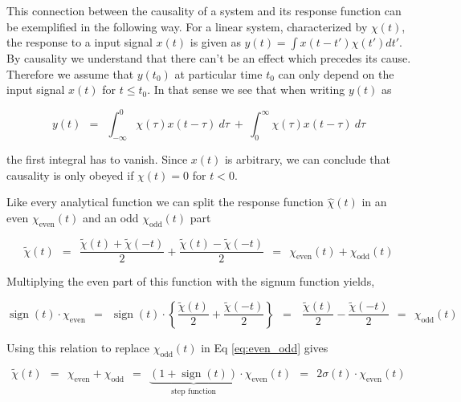 \documentclass[10pt]{report}
\numberwithin{equation}{chapter}
\newcommand{\refEq}[1]{
  Eq  \ref{#1}
}
\DeclareMathOperator{\sign}{sign}
\begin{document}
This connection between the causality of a system and its response function can be exemplified in the following way.
For a linear system, characterized by $\chi(t)$, the response to a input signal $x(t)$ is given as $y(t) = \int x(t -t') \chi(t') dt'$. 
By causality we understand that there can't be an effect which precedes its cause. Therefore we assume that $y(t_0)$ at particular time $t_0$ can only depend on the input signal $x(t)$ for $t \leq t_0$. In that sense we see that when writing $y(t)$ as


\begin{equation}
  y(t) ~~=~~ \int_{-\infty}^0 \chi(\tau) x(t-\tau)\ d\tau ~+~ \int_0^\infty \chi(\tau) x(t-\tau)\ d\tau
\end{equation}

the first integral has to vanish. Since $x(t)$ is arbitrary, we can conclude that causality is only obeyed if $\chi(t)=0$ for $t<0$.

Like every analytical function we can split the response function $\hat{\chi}(t)$ in an even $\chi_\text{even}(t)$ and an odd $\chi_\text{odd}(t)$ part


\begin{equation} \label{eq:even_odd}
\tilde{\chi}(t) ~~ = ~~ \frac{\tilde{\chi}(t) + \tilde{\chi}(-t)}{2} + \frac{\tilde{\chi}(t) - \tilde{\chi}(-t)}{2} ~~ = ~~ \chi_\text{even}(t) + \chi_\text{odd}(t)
\end{equation}


Multiplying the even part of this function with the signum function yields,

\begin{equation}
  \sign(t) \cdot \chi_\text{even} ~~ = ~~ \sign(t) \cdot \left\{ \frac{\tilde{\chi}(t)}{2} + \frac{\tilde{\chi}(-t)}{2} \right\} ~~ = ~~~\frac{\tilde{\chi}(t)}{2} - \frac{\tilde{\chi}(-t)}{2} ~~ = ~~ \chi_\text{odd}(t)
\end{equation}


Using this relation to replace $\chi_\text{odd}(t)$ in \refEq{eq:even_odd} gives


\begin{equation}
\tilde{\chi}(t) ~~ = ~~ \chi_\text{even} + \chi_\text{odd} ~~ = ~~ \underbrace{(1 + \sign(t))}_\text{step function} \cdot \chi_\text{even}(t) ~~ = ~~ 2 \sigma(t) \cdot \chi_\text{even}(t)
\end{equation}

\end{document}
